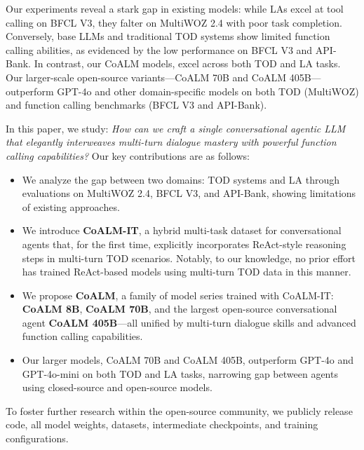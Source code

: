 Our experiments reveal a stark gap in existing models: while LAs excel at tool calling on BFCL V3, they falter on MultiWOZ 2.4 with poor task completion. Conversely, base LLMs and traditional TOD systems show limited function calling abilities, as evidenced by the low performance on BFCL V3 and API-Bank. In contrast, our CoALM models, excel across both TOD and LA tasks. Our larger-scale open-source variants—CoALM 70B and CoALM 405B—outperform GPT-4o and other domain-specific models on both TOD (MultiWOZ) and function calling benchmarks (BFCL V3 and API-Bank).


In this paper, we study: \textit{How can we craft a single conversational agentic LLM that elegantly interweaves multi-turn dialogue mastery with powerful function calling capabilities?} Our key contributions are as follows:
\begin{itemize}[topsep=2pt, partopsep=-5pt, leftmargin=8pt, itemsep=-4.5pt]
    \item We analyze the gap between two domains: TOD systems and LA through evaluations on MultiWOZ 2.4, BFCL V3, and API-Bank, showing limitations of existing approaches.
    \item We introduce \textbf{CoALM-IT}, a hybrid multi-task dataset for conversational agents that, for the first time, explicitly incorporates ReAct-style reasoning steps in multi-turn TOD scenarios. Notably, to our knowledge, no prior effort has trained ReAct-based models using multi-turn TOD data in this manner.
    \item We propose \textbf{CoALM}, a family of model series trained with CoALM-IT: \textbf{CoALM 8B}, \textbf{CoALM 70B}, and the largest open-source conversational agent \textbf{CoALM 405B}—all unified by multi-turn dialogue skills and advanced function calling capabilities. 
     \item Our larger models, CoALM 70B and CoALM 405B, outperform GPT-4o and GPT-4o-mini on both TOD and LA tasks, narrowing gap between agents using closed-source and open-source models.
\end{itemize}
To foster further research within the open-source community, we publicly release code, all model weights, datasets, intermediate checkpoints, and training configurations.